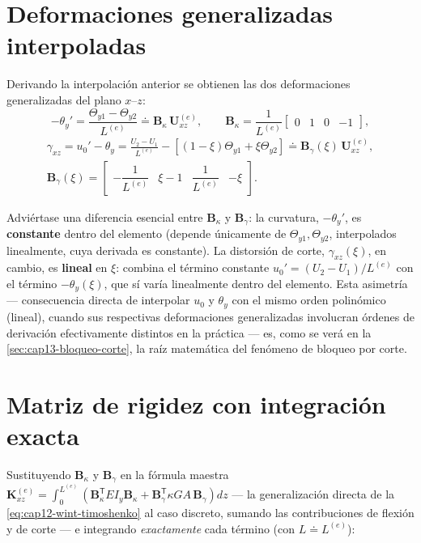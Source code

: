 \section{Deformaciones generalizadas interpoladas}
\label{sec:cap13-deformaciones-interpoladas}

Derivando la interpolación anterior se obtienen las dos deformaciones generalizadas del plano $x$--$z$:
\[
-\theta_y' = \frac{\Theta_{y1}-\Theta_{y2}}{L^{(e)}} \doteq \bm B_\kappa\,\bm U^{(e)}_{xz}, \qquad
\bm B_\kappa = \frac{1}{L^{(e)}}\begin{bmatrix}0&1&0&-1\end{bmatrix} ,
\]
\[
\begin{gathered}
\gamma_{xz} = u_0'-\theta_y = \frac{U_2-U_1}{L^{(e)}} - \left[(1-\xi)\Theta_{y1}+\xi\Theta_{y2}\right] \doteq \bm B_\gamma(\xi)\,\bm U^{(e)}_{xz}, \\[4pt]
\bm B_\gamma(\xi) = \begin{bmatrix} -\dfrac1{L^{(e)}} & \xi-1 & \dfrac1{L^{(e)}} & -\xi \end{bmatrix} .
\end{gathered}
\]

\begin{observacion}
Adviértase una diferencia esencial entre $\bm B_\kappa$ y $\bm B_\gamma$: la curvatura, $-\theta_y'$, es \textbf{constante} dentro del elemento (depende únicamente de $\Theta_{y1},\Theta_{y2}$, interpolados linealmente, cuya derivada es constante). La distorsión de corte, $\gamma_{xz}(\xi)$, en cambio, es \textbf{lineal} en $\xi$: combina el término constante $u_0'=(U_2-U_1)/L^{(e)}$ con el término $-\theta_y(\xi)$, que sí varía linealmente dentro del elemento. Esta asimetría --- consecuencia directa de interpolar $u_0$ y $\theta_y$ con el mismo orden polinómico (lineal), cuando sus respectivas deformaciones generalizadas involucran órdenes de derivación efectivamente distintos en la práctica --- es, como se verá en la \cref{sec:cap13-bloqueo-corte}, la raíz matemática del fenómeno de bloqueo por corte.
\end{observacion}

\section{Matriz de rigidez con integración exacta}
\label{sec:cap13-K-exacta}

Sustituyendo $\bm B_\kappa$ y $\bm B_\gamma$ en la fórmula maestra $\bm K^{(e)}_{xz}=\int_0^{L^{(e)}}\left(\bm B_\kappa^{\mathsf T}EI_y\bm B_\kappa + \bm B_\gamma^{\mathsf T}\kappa GA\,\bm B_\gamma\right)dz$ --- la generalización directa de la \cref{eq:cap12-wint-timoshenko} al caso discreto, sumando las contribuciones de flexión y de corte --- e integrando \emph{exactamente} cada término (con $L\doteq L^{(e)}$):

